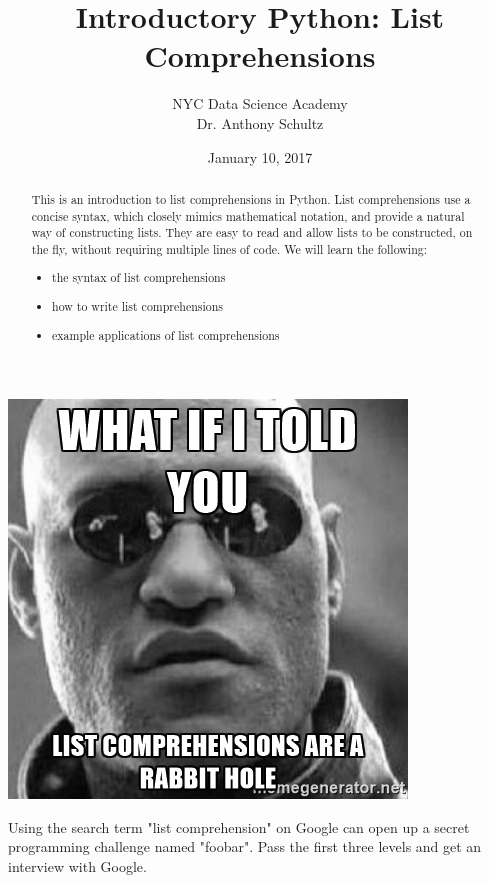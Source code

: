 \documentclass{tufte-handout}
\title{Introductory Python: List Comprehensions }
\author[Schultz]{NYC Data Science Academy\\Dr. Anthony Schultz}
\date{January 10, 2017} %
\begin{document}
\maketitle%
\begin{marginfigure}[-50pt]%
  \includegraphics[width=\linewidth]{morpheus.jpg}
  \caption{Using the search term "list comprehension" on Google can open up a secret programming challenge named "foobar".  Pass the first three levels and get an interview with Google.}
  \label{fig:marginfig}
\end{marginfigure}
\begin{abstract}
\noindent
This is an introduction to list comprehensions in Python.  List comprehensions use a concise syntax,  which closely mimics mathematical notation, and provide a natural way of constructing lists.  They are easy to read and allow lists to be constructed, on the fly, without requiring multiple lines of code.    We will learn the following: 
\begin{itemize}
\item the syntax of list comprehensions
\item how to write list comprehensions
 \item example applications of list comprehensions
 \end{itemize} \end{abstract}
\end{document}
